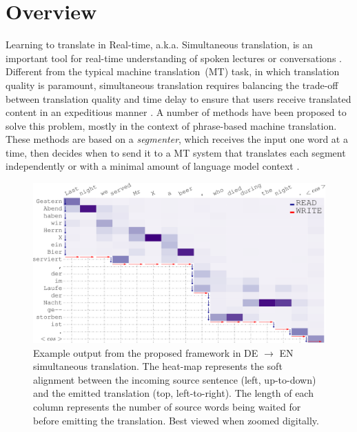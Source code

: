 \section{Overview}
Learning to translate in Real-time, a.k.a. Simultaneous translation, is an important tool for real-time understanding of spoken lectures or conversations \cite{fugen2007simultaneous,bangalore2012real}.
Different from the typical machine translation~(MT) task, in which translation quality is paramount, simultaneous translation requires balancing the trade-off between translation quality and time delay to ensure that users receive translated content in an expeditious manner \cite{mieno2015speed}.
A number of methods have been proposed to solve this problem, mostly in the context of phrase-based machine translation.
These methods are based on a \textit{segmenter}, which receives the input one word at a time, then decides when to send it to a MT system that translates each segment independently \cite{oda-EtAl:2014:P14-2} or with a minimal amount of language model context \cite{bangalore2012real}.
\begin{figure}[!t]
   	\centering
          	\includegraphics[width=0.9\linewidth]{figs/simultrans/cropped_kkkk.pdf} 
          	\caption{\label{cp9.fig.crop} {Example output from the proposed framework in DE $\rightarrow$ EN simultaneous translation. The heat-map represents the soft alignment between the incoming source sentence (left, up-to-down) and the emitted translation (top, left-to-right). The length of each column represents the number of source words being waited for before emitting the translation. Best viewed when zoomed digitally.}}
\end{figure} 

